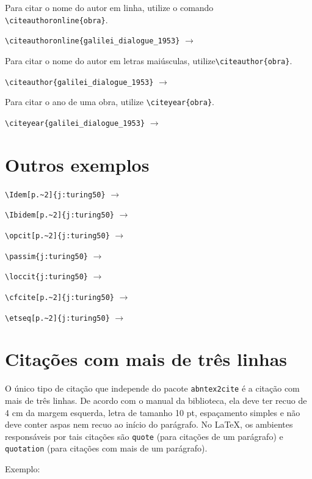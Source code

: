 \documentclass{fei}
\begin{document}
	Para citar o nome do autor em linha, utilize o comando \verb+\citeauthoronline{obra}+.

	\verb++ \(\to\) \citeauthoronline{galilei_dialogue_1953}
	
	Para citar o nome do autor em letras maiúsculas, utilize\verb+\citeauthor{obra}+.

	\verb+\citeauthor{galilei_dialogue_1953}+ \(\to\) \citeauthor{galilei_dialogue_1953}

	Para citar o ano de uma obra, utilize \verb+\citeyear{obra}+.
	
	\verb+\citeyear{galilei_dialogue_1953}+ \(\to\) \citeyear{galilei_dialogue_1953}

	\section{Outros exemplos}

	\verb++ \(\to\) \Idem[p.~2]{j:turing50}

	\verb++ \(\to\) \Ibidem[p.~2]{j:turing50}

	\verb++ \(\to\) \opcit[p.~2]{j:turing50}

	\verb++ \(\to\) \passim{j:turing50}

	\verb++ \(\to\) \loccit{j:turing50}

	\verb++ \(\to\) \cfcite[p.~2]{j:turing50}

	\verb++ \(\to\) \etseq[p.~2]{j:turing50}
	
	\section{Citações com mais de três linhas}
	
	O único tipo de citação que independe do pacote \texttt{abntex2cite} é a citação com mais de três linhas. De acordo com o manual da biblioteca, ela deve ter recuo de 4 cm da margem esquerda, letra de tamanho 10 pt, espaçamento simples e não deve conter aspas nem recuo ao início do parágrafo. No \index{\LaTeX}\LaTeX, os ambientes responsáveis por tais citações são \texttt{quote} (para citações de um parágrafo) e \texttt{quotation} (para citações com mais de um parágrafo).
	
	Exemplo:
	
\end{document}
